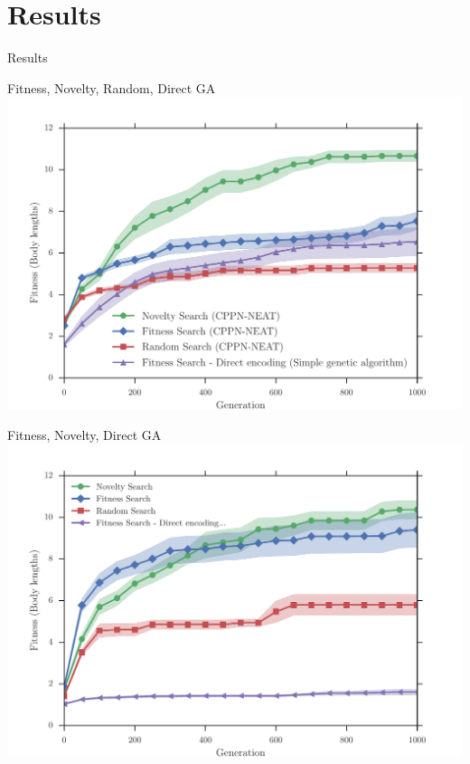 \documentclass{beamer}
\begin{document}
\section{Results}

\begin{frame}[allowframebreaks]{Results}

\begin{minipage}{\textwidth}
\begin{block}{Fitness, Novelty, Random, Direct GA}
\includegraphics[width=1.0\textwidth]{../Figures/Results/FitNovRandomDirectSize5.pdf}
\end{block}
\end{minipage}

\begin{minipage}{\textwidth}
\begin{block}{Fitness, Novelty, Direct GA}
\includegraphics[width=1.0\textwidth]{../Figures/Results/FitvsNovVsDirSize10.pdf}
\end{block}
\end{minipage}


\end{frame}
\end{document}
